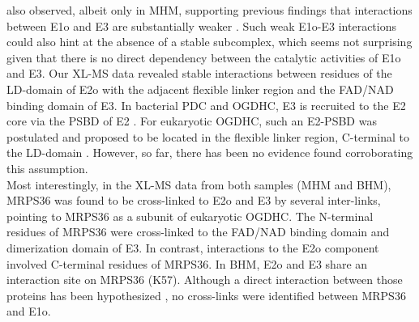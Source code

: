 also observed, albeit only in MHM, supporting previous findings that interactions between E1o and E3 are substantially weaker \cite{Zhou_2018}. Such weak E1o-E3 interactions could also hint at the absence of a stable subcomplex, which seems not surprising given that there is no direct dependency between the catalytic activities of E1o and E3. Our XL-MS data revealed stable interactions between residues of the LD-domain of E2o with the adjacent flexible linker region and the FAD/NAD binding domain of E3. In bacterial PDC and OGDHC, E3 is recruited to the E2 core via the PSBD of E2 \cite{Frank_2005, Fries_2007, Mande_1996, Perham_2000, Robien_1992}. For eukaryotic OGDHC, such an E2-PSBD was postulated and proposed to be located in the flexible linker region, C-terminal to the LD-domain \cite{Liu_2022}. However, so far, there has been no evidence found corroborating this assumption.\\ 
Most interestingly, in the XL-MS data from both samples (MHM and BHM), MRPS36 was found to be cross-linked to E2o and E3 by several inter-links, pointing to MRPS36 as a subunit of eukaryotic OGDHC. The N-terminal residues of MRPS36 were cross-linked to the FAD/NAD binding domain and dimerization domain of E3. In contrast, interactions to the E2o component involved C-terminal residues of MRPS36. In BHM, E2o and E3 share an interaction site on MRPS36 (K57). Although a direct interaction between those proteins has been hypothesized \cite{Heublein_2014}, no cross-links were identified between MRPS36 and E1o.\\
